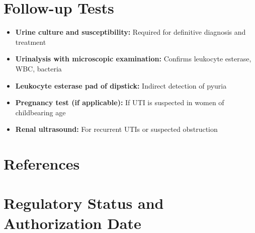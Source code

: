 \section*{Follow-up Tests}
\begin{itemize}
  \item \textbf{Urine culture and susceptibility:} Required for definitive diagnosis and treatment
  \item \textbf{Urinalysis with microscopic examination:} Confirms leukocyte esterase, WBC, bacteria
  \item \textbf{Leukocyte esterase pad of dipstick:} Indirect detection of pyuria
  \item \textbf{Pregnancy test (if applicable):} If UTI is suspected in women of childbearing age
  \item \textbf{Renal ultrasound:} For recurrent UTIs or suspected obstruction
\end{itemize}

\section*{References}



\clearpage
\section*{Regulatory Status and Authorization Date}

\clearpage
